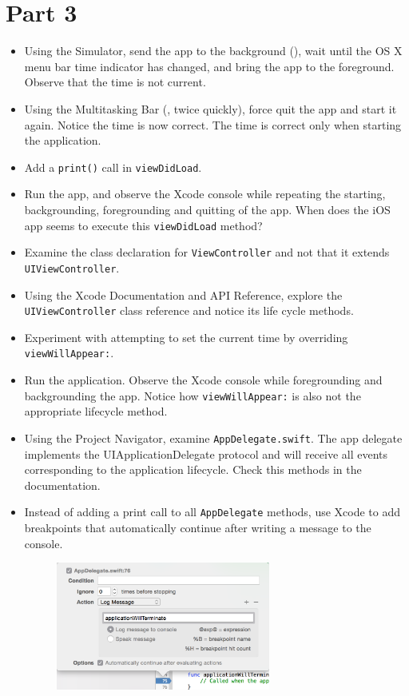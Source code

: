 \documentclass[a4paper,11pt]{scrartcl}
\begin{document}
\section*{Part 3}

\begin{itemize}
\item Using the Simulator, send the app to the background (), wait until the OS X menu bar time indicator has changed, and bring the app to the foreground. Observe that the time is not current.
\item Using the Multitasking Bar (, twice quickly), force quit the app and start it again. Notice the time is now correct. The time is correct only when starting the application.
\item Add a \texttt{print()} call in \texttt{viewDidLoad}.
\item Run the app, and observe the Xcode console while repeating the starting, backgrounding, foregrounding and quitting of the app. When does the iOS app seems to execute this \texttt{viewDidLoad} method?
\item Examine the class declaration for \texttt{ViewController} and not that it extends \texttt{UIViewController}.
\item Using the Xcode Documentation and API Reference, explore the \texttt{UIViewController} class reference and notice its life cycle methods.
\item Experiment with attempting to set the current time by overriding \texttt{viewWillAppear:}.
\item Run the application. Observe the Xcode console while foregrounding and backgrounding the app. Notice how \texttt{viewWillAppear:} is also not the appropriate lifecycle method.
\item Using the Project Navigator, examine \texttt{AppDelegate.swift}. The app delegate implements the UIApplicationDelegate protocol and will receive all events corresponding to the application lifecycle. Check this methods in the documentation.
\item Instead of adding a print call to all \texttt{AppDelegate} methods, use Xcode to add breakpoints that automatically continue after writing a message to the console.
\begin{figure}[h]
	\begin{center}
   \includegraphics[width=200pt]{breakpoint.png}

\end{center}
\end{figure}
\end{itemize}
\end{document}
